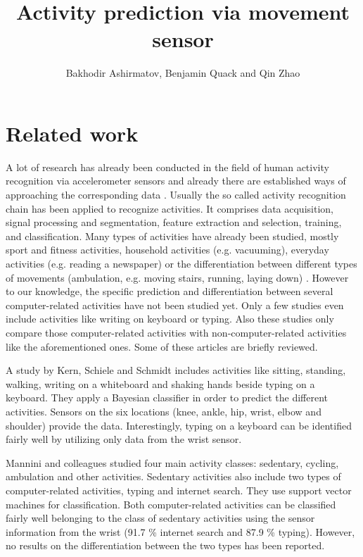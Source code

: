\documentclass[11pt,a4paper]{paper}
\title{Activity prediction via movement sensor}
\author{Bakhodir Ashirmatov, Benjamin Quack and Qin Zhao}
\begin{document}
\maketitle

\section{Related work}

A lot of research has already been conducted in the field of human activity recognition via
 accelerometer sensors and already there are established ways of approaching the corresponding data \cite{bullingetal2014}.
Usually the so called activity recognition chain has been applied to recognize activities. 
It comprises data acquisition, signal processing and segmentation, feature extraction and selection,
 training, and classification.
Many types of activities have already been studied, mostly sport and fitness activities, household activities (e.g. vacuuming),
 everyday activities (e.g. reading a newspaper) or the differentiation between different types 
 of movements (ambulation, e.g. moving stairs, running, laying down) \cite{banosetal2014}.
However to our knowledge, the specific prediction and differentiation between several computer-related activities have not been studied yet.
Only a few studies even include activities like writing on keyboard or typing. 
Also these studies only compare those computer-related activities with non-computer-related 
 activities like the aforementioned ones.
Some of these articles are briefly reviewed.
 
A study by Kern, Schiele and Schmidt \cite{kernetal2003} includes activities like sitting, standing, walking, writing on a whiteboard and shaking
 hands beside typing on a keyboard.
They apply a Bayesian classifier in order to predict the different activities.
Sensors on the six locations (knee, ankle, hip, wrist, elbow and shoulder) provide the data.
Interestingly, typing on a keyboard can be identified fairly well by utilizing only data from the wrist sensor.

Mannini and colleagues \cite{manninietal2013} studied four main activity classes:
 sedentary, cycling, ambulation and other activities. 
Sedentary activities also include two types of computer-related activities, typing and 
 internet search.
They use support vector machines for classification. 
Both computer-related activities can be classified fairly well 
 belonging to the class of sedentary activities using the sensor 
 information from the wrist (91.7 \% internet search and 87.9 \% typing).
However, no results on the differentiation between the two types
 has been reported.
\end{document}
